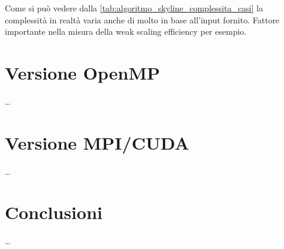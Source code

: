 \documentclass[12pt, a4paper]{article}
\begin{document}
Come si può vedere dalla \autoref{tab:algoritmo_skyline_complessita_casi} la complessità in realtà varia anche di molto in base
all'input fornito. Fattore importante nella misura della weak scaling efficiency per esempio.

\section{Versione OpenMP}

\dots

\section{Versione MPI/CUDA}

\dots

\section{Conclusioni}

\dots
\end{document}
